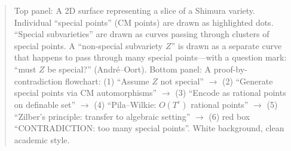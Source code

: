 \begin{quote}
Top panel: A 2D surface representing a slice of a Shimura variety. Individual ``special points'' (CM points) are drawn as highlighted dots. ``Special subvarieties'' are drawn as curves passing through clusters of special points. A ``non-special subvariety $Z$'' is drawn as a separate curve that happens to pass through many special points---with a question mark: ``must $Z$ be special?'' (Andr\'{e}--Oort). Bottom panel: A proof-by-contradiction flowchart: (1) ``Assume $Z$ not special'' $\to$ (2) ``Generate special points via CM automorphisms'' $\to$ (3) ``Encode as rational points on definable set'' $\to$ (4) ``Pila--Wilkie: $O(T^\varepsilon)$ rational points'' $\to$ (5) ``Zilber's principle: transfer to algebraic setting'' $\to$ (6) red box ``CONTRADICTION: too many special points''. White background, clean academic style.
\end{quote}
